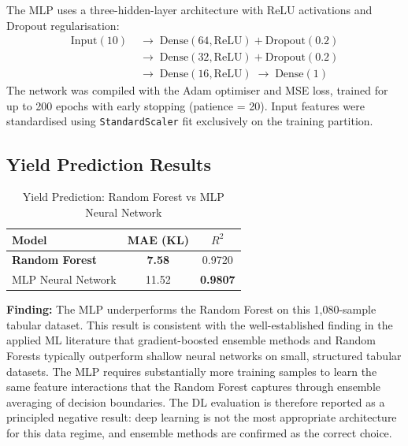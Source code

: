 \documentclass[conference]{IEEEtran}
\begin{document}
The MLP uses a three-hidden-layer architecture with ReLU activations and
Dropout regularisation:
\begin{align}
  \text{Input}(10) &\;\to\; \text{Dense}(64, \text{ReLU}) + \text{Dropout}(0.2) \nonumber \\
  &\;\to\; \text{Dense}(32, \text{ReLU}) + \text{Dropout}(0.2) \nonumber \\
  &\;\to\; \text{Dense}(16, \text{ReLU}) \;\to\; \text{Dense}(1) \nonumber
\end{align}
The network was compiled with the Adam optimiser and MSE loss, trained for
up to 200 epochs with early stopping (patience = 20). Input features were
standardised using \texttt{StandardScaler} fit exclusively on the training
partition.

\subsection{Yield Prediction Results}

\begin{table}[htbp]
\caption{Yield Prediction: Random Forest vs MLP Neural Network}
\begin{center}
\begin{tabular}{lcc}
\toprule
\textbf{Model} & \textbf{MAE (KL)} & \textbf{$R^2$} \\
\midrule
\textbf{Random Forest} & \textbf{7.58} & 0.9720 \\
MLP Neural Network    & 11.52 & \textbf{0.9807} \\
\bottomrule
\end{tabular}
\label{tab:dl}
\end{center}
\end{table}


\textbf{Finding:} The MLP underperforms the Random Forest on this
1,080-sample tabular dataset. This result is consistent with the
well-established finding in the applied ML literature that gradient-boosted
ensemble methods and Random Forests typically outperform shallow neural
networks on small, structured tabular datasets. The MLP
requires substantially more training samples to learn the same feature
interactions that the Random Forest captures through ensemble averaging of
decision boundaries. The DL evaluation is therefore reported as a principled
negative result: deep learning is not the most appropriate architecture for
this data regime, and ensemble methods are confirmed as the correct choice.

\end{document}
